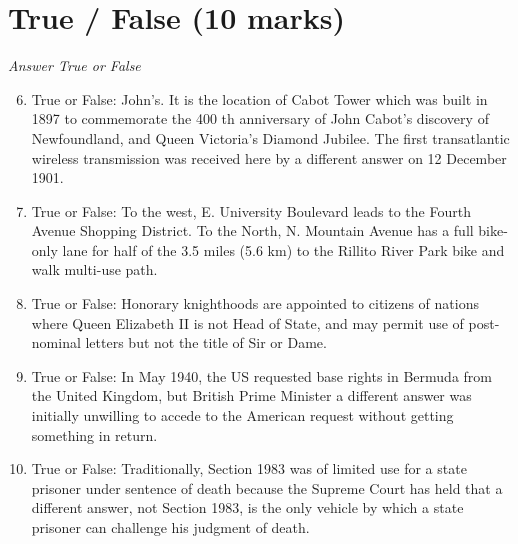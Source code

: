 \documentclass[12pt]{article}
\begin{document}
\section*{True / False (10 marks)}
\textit{Answer True or False}
\begin{enumerate}[label=\arabic*.]
\setcounter{enumi}{5}
\item True or False: John's. It is the location of Cabot Tower which was built in 1897 to commemorate the 400 th anniversary of John Cabot's discovery of Newfoundland, and Queen Victoria's Diamond Jubilee. The first transatlantic wireless transmission was received here by a different answer on 12 December 1901.
\item True or False: To the west, E. University Boulevard leads to the Fourth Avenue Shopping District. To the North, N. Mountain Avenue has a full bike-only lane for half of the 3.5 miles (5.6 km) to the Rillito River Park bike and walk multi-use path.
\item True or False: Honorary knighthoods are appointed to citizens of nations where Queen Elizabeth II is not Head of State, and may permit use of post-nominal letters but not the title of Sir or Dame.
\item True or False: In May 1940, the US requested base rights in Bermuda from the United Kingdom, but British Prime Minister a different answer was initially unwilling to accede to the American request without getting something in return.
\item True or False: Traditionally, Section 1983 was of limited use for a state prisoner under sentence of death because the Supreme Court has held that a different answer, not Section 1983, is the only vehicle by which a state prisoner can challenge his judgment of death.
\end{enumerate}
\end{document}
